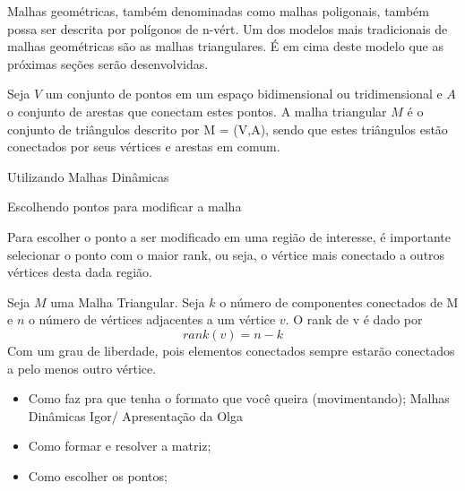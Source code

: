 
Malhas geométricas, também denominadas como malhas poligonais, também possa ser descrita por polígonos de n-vért. Um dos modelos mais tradicionais de malhas geométricas são as malhas triangulares. É em cima deste modelo que as próximas seções serão desenvolvidas.

\begin{defi}
Seja $V$ um conjunto de pontos em um espaço bidimensional ou tridimensional e $A$ o conjunto de arestas que conectam estes pontos. A malha triangular $M$ é o conjunto de triângulos descrito por M = (V,A), sendo que estes triângulos estão conectados por seus vértices e arestas em comum.
\end{defi}
Utilizando Malhas Dinâmicas



Escolhendo pontos para modificar a malha

Para escolher o ponto a ser modificado em uma região de interesse, é importante selecionar o ponto com o maior rank, ou seja, o vértice mais conectado a outros vértices desta dada região.

\begin{defi}[Rank]
\end{defi}
Seja $M$ uma Malha Triangular. Seja $k$ o número de componentes conectados de M e $n$ o número de vértices adjacentes a um vértice $v$.
O rank de v é dado por 
\begin{equation}
rank(v) = n - k
\end{equation}
Com um grau de liberdade, pois elementos conectados sempre estarão conectados a pelo menos outro vértice.


\begin{itemize}
    \item Como faz pra que tenha o formato que você queira (movimentando); Malhas Dinâmicas Igor/ Apresentação da Olga
    \item Como formar e resolver a matriz;
    \item Como escolher os pontos;
\end{itemize}